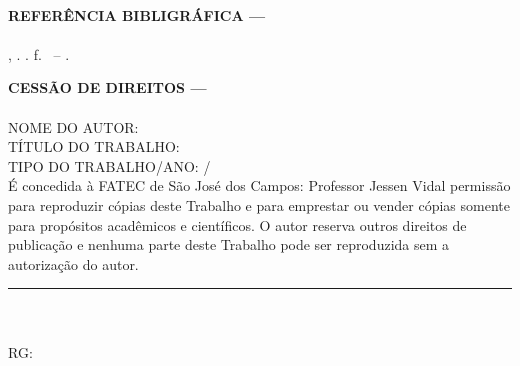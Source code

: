 \noindent{}\\
\parbox{400\unitlength}{
\vspace*{2cm}

\textbf{REFER\^ENCIA BIBLIGR\'AFICA ---} \\ \\
\sobrenomeRef, \nomeRef. \imprimirtitulo \the\year. \pageref{LastPage}f. \imprimirtipotrabalho\ -- \instituicaoRef.

\vspace*{3cm}
\textbf{CESS\~AO DE DIREITOS ---}\\ \\
NOME DO AUTOR: \imprimirautor \\
T\'ITULO DO TRABALHO: \imprimirtitulo \\
TIPO DO TRABALHO/ANO: \imprimirtipotrabalho/\the\year \\

\vspace*{2cm}
É concedida à FATEC de São José dos Campos: Professor Jessen Vidal permissão para reproduzir cópias deste Trabalho e para emprestar ou vender cópias somente para propósitos acadêmicos e científicos. O autor reserva outros direitos de publicação e nenhuma parte deste Trabalho pode ser reproduzida sem a autorização do autor.\\

\vspace*{2cm}
\noindent\rule{7cm}{0.4pt}\\
\imprimirautor \\RG: \rgRef
}